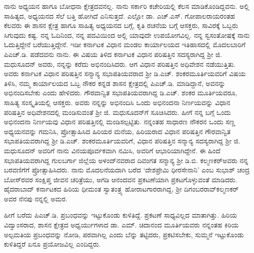 ನಾನು ಅಧ್ಯಯನ ಹಾಗೂ ಬೋಧನಾ ಕ್ಷೇತ್ರದವನಲ್ಲ. ನಾನು ಸರ್ಕಾರಿ ಕಚೇರಿಯಲ್ಲಿ ಕೆಲಸ ಮಾಡಿಕೊಂಡಿದ್ದವನು. ಅಲ್ಲಿ ಸಾಹಿತ್ಯದ, ಅಧ್ಯಯನದ ಸೆಲೆ ಬತ್ತಿ ಹೋಗಿದೆ ಎನಿಸುತ್ತದೆ. ಎಲ್ಲೋ ಡಾ. ಎಚ್​.ಎಸ್​. ಗೋಪಾಲರಾಯರಂತಹ ಕೆಲವರು ಈ ಶಾಸನ ಕ್ಷೇತ್ರ ಹಾಗೂ ಸಾಹಿತ್ಯ ಅಧ್ಯಯನದ ಬಗ್ಗೆ, ಕೃತಿ ರಚನೆಯ ಬಗ್ಗೆ ಆಸಕ್ತರು, ಸಾವಿರಕ್ಕೆ ಒಬ್ಬರು ಸಿಗುವುದು ಕಷ್ಟ. ನನ್ನ ಓದಿನಿಂದ, ನನ್ನ ಪದವಿಯಿಂದ ಅಲ್ಲಿ ಯಾವುದೇ ಉಪಯೋಗವಿಲ್ಲ. ನನ್ನ ಸ್ವಸಂತೋಷಕ್ಕೆ ನಾನು ಓದುತ್ತಿದ್ದೇನೆ ಬರೆಯುತ್ತಿದ್ದೇನೆ. ಇಡೀ ಕರ್ನಾಟಕ ವಿಧಾನ ಮಂಡಲ ಕಾರ್ಯಾಲಯದ ಇತಿಹಾಸದಲ್ಲಿ ಮೊದಲಬಾರಿಗೆ ಪಿಎಚ್​.ಡಿ. ಪಡೆದವನು ನಾನು. ಈ ವಿಷಯ ತಿಳಿದ ಕರ್ನಾಟಕ ವಿಧಾನ ಪರಿಷತ್ತಿನ ಸದಸ್ಯರಾಗಿದ್ದ ಶ‍್ರೀ ಜಿ. ಮಧುಸೂದನ್​ ಅವರು, ನನ್ನನ್ನು ಕರೆದು ಅಭಿನಂದಿಸಿದರು. ಆಗ ವಿಧಾನ ಪರಿಷತ್ತಿನ ಅಧಿವೇಶನ ನಡೆಯುತ್ತಿತು. ಅವರು ಕರ್ನಾಟಕ ವಿಧಾನ ಪರಿಷತ್ತಿನ ಸನ್ಮಾನ್ಯ ಸಭಾಪತಿಯವರಾದ ಶ‍್ರೀ ಡಿ.ಎಚ್​. ಶಂಕರಮೂರ್ತಿಯವರಿಗೆ ವಿಷಯ ತಿಳಿಸಿ, ನಮ್ಮ ಕಾರ್ಯಾಲಯದ ಒಬ್ಬ ನೌಕರ ಕನ್ನಡ ಶಾಸನ ಕ್ಷೇತ್ರದಲ್ಲಿ ಪಿಎಚ್​.ಡಿ. ಮಾಡಿದ್ದಾನೆ, ಅವನನ್ನು ಅಭಿನಂದಿಸಬೇಕು ಎಂದು ಹೇಳಿದರು. ಗೌರವಾನ್ವಿತ ಸಭಾಪತಿಯವರಾಗಿದ್ದ ಡಿ.ಎಚ್​. ಶಂಕರ ಮೂರ್ತಿಯವರೂ, ಸಾಹಿತ್ಯ ಸಂಸ್ಕೃತಿಯಲ್ಲಿ ಆಸಕ್ತರು. ಅವರು ನನ್ನನ್ನು ಅಭಿನಂದಿಸಿ ಒಂದು ಅಭಿನಂದನಾ ನಿರ್ಣಯವನ್ನು ವಿಧಾನ ಪರಿಷತ್ತಿನ ಅಧಿವೇಶನದಲ್ಲಿ ಮಂಡಿಸುವಂತೆ ಶ‍್ರೀ ಜಿ. ಮಧುಸೂದನ್​ಗೆ ಸೂಚಿಸಿದರು. ಹೀಗೆ ನನ್ನ ಬಗ್ಗೆ ಒಂದು ಅಭಿನಂದನಾ ನಿರ್ಣಯವು ವಿಧಾನ ಪರಿಷತ್ತಿನಲ್ಲಿ ಮಂಡಿಸಲ್ಪಟ್ಟಿತು. ನನ್ನಂತಹ ಸಾಧಾರಣ ನೌಕರನ ಒಂದು ಸಣ್ಣ ಅಧ್ಯಯನವನ್ನು ಗಮನಿಸಿ, ಪ್ರೋತ್ಸಾಹಿಸಿದ ಹಿರಿಯರ ಮನೆಯ, ಹಿರಿಯರಾದ ವಿಧಾನ ಪರಿಷತ್ತಿನ ಗೌರವಾನ್ವಿತ ಸಭಾಪತಿಯವರಾಗಿದ್ದ ಶ‍್ರೀ ಡಿ.ಎಚ್​. ಶಂಕರಮೂರ್ತಿಯವರಿಗೆ, ವಿಧಾನ ಪರಿಷತ್ತಿನ ಸನ್ಮಾನ್ಯ ಸದಸ್ಯರಾಗಿದ್ದ ಶ‍್ರೀ ಜಿ. ಮಧುಸೂದನ್​ ಅವರಿಗೆ ನಾನು ವಿನಯಪೂರ್ವಕವಾಗಿ ನಮಿಸಿ, ಅವರಿಗೆ ಆಭಾರಿಯಾಗಿದ್ದೇನೆ. ಈ ಹಿಂದೆ ಸಭಾಪತಿಯವರಾಗಿದ್ದ ಗುಲಬರ್ಗಾ ಜಿಲ್ಲೆಯ ಅಳಂದ್​ನವರಾದ ದಿವಂಗತ ಸನ್ಮಾನ್ಯ ಶ‍್ರೀ ಡಿ.ಬಿ. ಕಲ್ಮಣಕರ್​ ಅವರು ನನ್ನ ಬರವಣಿಗೆಗೆ ಪ್ರೋತ್ಸಾಹಿಸಿದರು. ನಾನು ಮೊದಲನೆಯದಾಗಿ ಬರೆದ ‘ದೇಶಪ್ರೇಮಿ ಧೀರಸೇನಾನಿ’ ಎಂಬ ಸುಭಾಶ್​ ಚಂದ್ರ ಬೋಸ್​ರವರ ಸಂಕ್ಷಿಪ್ತ ಜೀವನ ಚರಿತ್ರೆಯು, ಅಗಡಿ ಆನಂದವನ ಪ್ರಕಟಣೆಯಾಗಿ ಪ್ರಕಟಗೊಳ್ಳುವಂತೆ ಮಾಡಿದರು. ಹೈದರಾಬಾದ್​ ಕರ್ನಾಟಕದ ಹಿರಿಯ ಧೀಮಂತ ಸ್ವಾತಂತ್ರ್ಯ ಹೋರಾಟಗಾರರಾಗಿದ್ದ, ಶ‍್ರೀ ದಿಗಂಬರರಾವ್​ ಕಲ್ಮಣಕರ್​ ಅವರ ನೆನಪು ನನ್ನಲ್ಲಿ ಅಮರ.

ಹೀಗೆ ಬರೆದು ಪಿಎಚ್​.ಡಿ. ಪ್ರಬಂಧವನ್ನು ಇಟ್ಟುಕೊಂಡು ಕುಳಿತಿದ್ದೆ. ಪ್ರಕಟಣೆ ಸಾಧ್ಯವಿಲ್ಲದ ಮಾತಾಗಿತ್ತು. ಹಿರಿಯ ವಿದ್ವಾಂಸರಾದ, ಶಾಸನ ಕ್ಷೇತ್ರದ ಅಧ್ವರ್ಯುಗಳಾದ ಡಾ. ಎಮ್. ಚಿದಾನಂದ ಮೂರ್ತಿಯವರು ನನ್ನಂತಹ ಕಿರಿಯ ಅಲ್ಪಮತಿಯ ಪ್ರಬಂಧವನ್ನು ನೋಡಿ, ಪರವಾಗಿಲ್ಲ ಎಂದು ಬೆನ್ನು ತಟ್ಟಿದರು, ಪ್ರಕಟಿಸಬೇಕು, ಸುಮ್ಮನೆ ಇಟ್ಟುಕೊಂಡು ಕುಳಿತಿದ್ದರೆ ಏನೂ ಪ್ರಯೋಜವಿಲ್ಲ ಎಂದಿದ್ದರು. 

